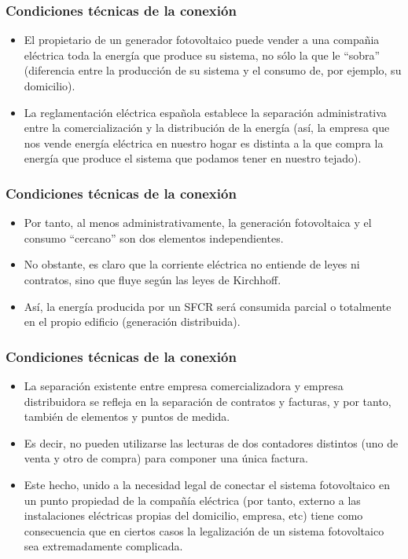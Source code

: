 \documentclass[serif, xcolor=dvipsnames]{beamer}
\begin{document}
\begin{frame}
  \frametitle{Condiciones técnicas de la conexión}
  \begin{itemize}
  \item El propietario de un generador fotovoltaico puede vender a una
    compañia eléctrica toda la energía que produce su sistema, no sólo
    la que le \textquotedblleft{}sobra\textquotedblright{} (diferencia
    entre la producción de su sistema y el consumo de, por ejemplo, su
    domicilio).
  \item La reglamentación eléctrica española establece la separación
    administrativa entre la comercialización y la distribución de la
    energía (así, la empresa que nos vende energía eléctrica en
    nuestro hogar es distinta a la que compra la energía que produce
    el sistema que podamos tener en nuestro tejado).
  \end{itemize}

\end{frame}
\begin{frame}
  \frametitle{Condiciones técnicas de la conexión}
  \begin{itemize}
  \item Por tanto, al menos administrativamente, la generación
    fotovoltaica y el consumo
    \textquotedblleft{}cercano\textquotedblright{} son dos elementos
    independientes.
  \item No obstante, es claro que la corriente eléctrica no entiende
    de leyes ni contratos, sino que fluye según las leyes de
    Kirchhoff.
  \item Así, la energía producida por un SFCR será consumida parcial o
    totalmente en el propio edificio (generación distribuida).
  \end{itemize}

\end{frame}
\begin{frame}
  \frametitle{Condiciones técnicas de la conexión}
  \begin{itemize}
  \item La separación existente entre empresa comercializadora y
    empresa distribuidora se refleja en la separación de contratos y
    facturas, y por tanto, también de elementos y puntos de medida.
  \item Es decir, no pueden utilizarse las lecturas de dos contadores
    distintos (uno de venta y otro de compra) para componer una única
    factura.
  \item Este hecho, unido a la necesidad legal de conectar el sistema
    fotovoltaico en un punto propiedad de la compañía eléctrica (por
    tanto, externo a las instalaciones eléctricas propias del
    domicilio, empresa, etc) tiene como consecuencia que en ciertos
    casos la legalización de un sistema fotovoltaico sea
    extremadamente complicada.
  \end{itemize}

\end{frame}
\end{document}
